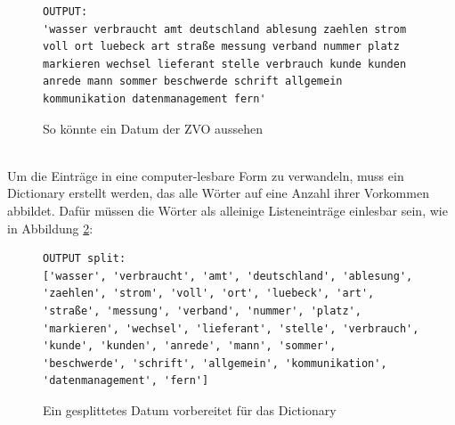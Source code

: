 \documentclass[german,version-2020-11]{uzl-thesis}
\begin{document}
\begin{figure}[h]
\begin{lstlisting}
OUTPUT: 
'wasser verbraucht amt deutschland ablesung zaehlen strom voll ort luebeck art straße messung verband nummer platz markieren wechsel lieferant stelle verbrauch kunde kunden anrede mann sommer beschwerde schrift allgemein kommunikation datenmanagement fern'
\end{lstlisting}
\caption{So könnte ein Datum der ZVO aussehen} 
\label{fig:data1}
\end{figure}\\

Um die Einträge in eine computer-lesbare Form zu verwandeln, muss ein Dictionary erstellt werden, das alle Wörter auf eine Anzahl ihrer Vorkommen abbildet. Dafür müssen die Wörter als alleinige Listeneinträge einlesbar sein, wie in Abbildung \ref{fig:data2}: \\

\begin{figure}[h]
\begin{lstlisting}
OUTPUT split: 
['wasser', 'verbraucht', 'amt', 'deutschland', 'ablesung', 'zaehlen', 'strom', 'voll', 'ort', 'luebeck', 'art', 'straße', 'messung', 'verband', 'nummer', 'platz', 'markieren', 'wechsel', 'lieferant', 'stelle', 'verbrauch', 'kunde', 'kunden', 'anrede', 'mann', 'sommer', 'beschwerde', 'schrift', 'allgemein', 'kommunikation', 'datenmanagement', 'fern']
\end{lstlisting}
\caption{Ein gesplittetes Datum vorbereitet für das Dictionary}
\label{fig:data2}
\end{figure}\\
\end{document}
